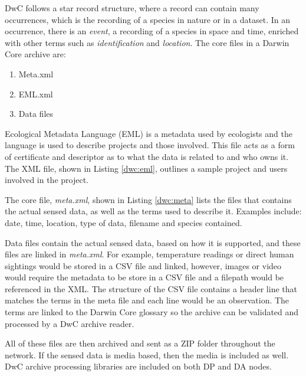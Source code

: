 DwC follows a star record structure, where a record can contain many occurrences, which is the recording of a species in nature or in a dataset. In an occurrence, there is an \textit{event}, a recording of a species in space and time, enriched with other terms such as \textit{identification} and \textit{location}. The core files in a Darwin Core archive are:
\begin{enumerate}
	\item Meta.xml
	\item EML.xml
	\item Data files
\end{enumerate}

Ecological Metadata Language (EML) is a metadata used by ecologists and the language is used to describe projects and those involved. This file acts as a form of certificate and descriptor as to what the data is related to and who owns it. The XML file, shown in Listing \ref{dwc:eml}, outlines a sample project and users involved in the project.



The core file, \textit{meta.xml}, shown in Listing \ref{dwc:meta} lists the files that contains the actual sensed data, as well as the terms used to describe it. Examples include: date, time, location, type of data, filename and species contained.



Data files contain the actual sensed data, based on how it is supported, and these files are linked in \textit{meta.xml}. For example, temperature readings or direct human sightings would be stored in a CSV file and linked, however, images or video would require the metadata to be store in a CSV file and a filepath would be referenced in the XML. The structure of the CSV file contains a header line that matches the terms in the meta file and each line would be an observation. The terms are linked to the Darwin Core glossary so the archive can be validated and processed by a DwC archive reader.

All of these files are then archived and sent as a ZIP folder throughout the network. If the sensed data is media based, then the media is included as well. DwC archive processing libraries are included on both DP and DA nodes.

